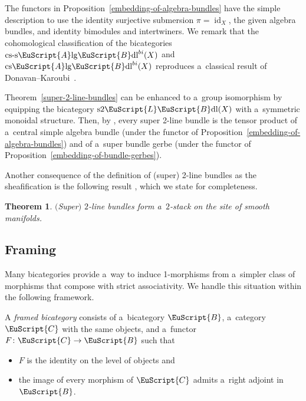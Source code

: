 \documentclass[pdftex]{sigma}
\numberwithin{equation}{section}
\newtheorem{Theorem}{Theorem}[section]
\def\mathscr#1{\EuScript{#1}}
\newcommand{\id}{\operatorname{id}}
\newcommand{\LineBdl}{\mathscr{L}\mathscr{B}\mathrm{dl}}
\newcommand{\stwoLineBdl}{\mathrm{s}2\LineBdl}
\newcommand{\Alg}{\Incl\mathrm{lg}}
\newcommand{\csAlg}{\mathrm{cs}\Incl\mathrm{lg}}
\newcommand{\cssAlg}{\mathrm{cs\text{-}s}\Alg}
\newcommand{\csAlgBdl}{\csAlg\mathscr{B}\mathrm{dl}}
\newcommand{\cssAlgBdl}{\cssAlg\mathscr{B}\mathrm{dl}}
\newcommand{\Incl}{\mathscr{A}}
\begin{document}
The functors in Proposition~\ref{embedding-of-algebra-bundles} have the simple description to use the identity surjective submersion $\pi=\id_X$, the given algebra bundles, and identity bimodules and intertwiners.
We remark that the cohomological classification of the bicategories $\cssAlgBdl^{bi}(X)$ and $\csAlgBdl^{bi}(X)$ reproduces a~classical result of Donavan--Karoubi~\cite{DK70}.


\begin{Remark}
Theorem~\ref{super-2-line-bundles} can be enhanced to a~group isomorphism by equipping the bicategory $\stwoLineBdl(X)$ with a~symmetric monoidal structure. Then, by \cite[Corollary~4.4.10]{Kristel2020}, every super 2-line bundle is the tensor product of a~central simple algebra bundle (under the functor of Proposition~\ref{embedding-of-algebra-bundles}) and of a~super bundle gerbe (under the functor of Proposition~\ref{embedding-of-bundle-gerbes}).
\end{Remark}

Another consequence of the definition of (super) 2-line bundles as the sheafification is the following result \cite[Theorem~2.3.3]{Kristel2020}, which we state for completeness.

\begin{Theorem}\label{2-line-bundles-form-stack}
$($Super$)$ $2$-line bundles form a~$2$-stack on the site of smooth manifolds.
\end{Theorem}


\subsection{Framing}
\label{framing}

Many bicategories provide a~way to induce 1-morphisms from a~simpler class of morphisms that compose with strict associativity. We handle this situation within the following framework.

\begin{Definition} \label{Definition: framed bicategory}
 A \emph{framed bicategory} consists of a~bicategory $\mathscr{B}$, a~category $\mathscr{C}$ with the same objects,
 and a~functor $F \colon \mathscr{C} \to \mathscr{B}$ such that
 \begin{itemize}\itemsep=0pt
 \item $F$ is the identity on the level of objects and
 \item the image of every morphism of $\mathscr{C}$ admits a~right adjoint in $\mathscr{B}$.
 \end{itemize}
\end{Definition}
\end{document}
